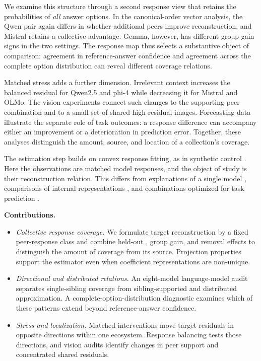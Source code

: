 We examine this structure through a second response view that retains the probabilities of \emph{all} answer options. In the canonical-order vector analysis, the Qwen pair again differs in whether additional peers improve reconstruction, and Mistral retains a collective advantage. Gemma, however, has different group-gain signs in the two settings. The response map thus selects a substantive object of comparison: agreement in reference-answer confidence and agreement across the complete option distribution can reveal different coverage relations.

Matched stress adds a further dimension. Irrelevant context increases the balanced residual for Qwen2.5 and phi-4 while decreasing it for Mistral and OLMo. The vision experiments connect such changes to the supporting peer combination and to a small set of shared high-residual images. Forecasting data illustrate the separate role of task outcomes: a response difference can accompany either an improvement or a deterioration in prediction error. Together, these analyses distinguish the amount, source, and location of a collection's coverage.

The estimation step builds on convex response fitting, as in synthetic control \citep{abadie2010synthetic}. Here the observations are matched model responses, and the object of study is their reconstruction relation. This differs from explanations of a single model \citep{ribeiro2016lime,sundararajan2017integrated,wachter2017counterfactual}, comparisons of internal representations \citep{raghu2017svcca,kornblith2019cka}, and combinations optimized for task prediction \citep{hinton2015distilling,wortsman2022model}.

\noindent\textbf{Contributions.}
\begin{itemize}[leftmargin=1.2em,itemsep=2pt,topsep=3pt]
\item \emph{Collective response coverage.} We formulate target reconstruction by a fixed peer-response class and combine held-out \PIER, group gain, and removal effects to distinguish the amount of coverage from its source. Projection properties support the estimator even when coefficient representations are non-unique.
\item \emph{Directional and distributed relations.} An eight-model language-model audit separates single-sibling coverage from sibling-supported and distributed approximation. A complete-option-distribution diagnostic examines which of these patterns extend beyond reference-answer confidence.
\item \emph{Stress and localization.} Matched interventions move target residuals in opposite directions within one ecosystem. Response balancing tests those directions, and vision audits identify changes in peer support and concentrated shared residuals.
\end{itemize}
